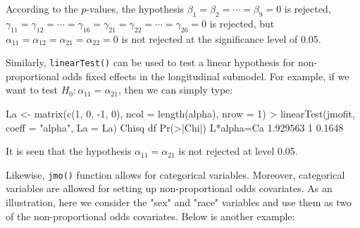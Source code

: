 According to the $p$-values, the hypothesis $\beta_1=\beta_2=\cdots=\beta_9=0$ is rejected, $\gamma_{11}=\gamma_{12}=\cdots=\gamma_{16}= \gamma_{21}=\gamma_{22}=\cdots=\gamma_{26}=0$ is rejected, but $\alpha_{11}=\alpha_{12}= \alpha_{21}=\alpha_{22}=0$ is not rejected at the significance level of 0.05.

Similarly, \texttt{linearTest()} can be used to test a linear hypothesis for non-proportional odds fixed effects in the longitudinal submodel. For example, if we want to test $H_0 : \alpha_{11} = \alpha_{21}$, then we can simply type:

\begin{example}
La <- matrix(c(1, 0, -1, 0), ncol = length(alpha), nrow = 1)
> linearTest(jmofit, coeff = "alpha", La = La)
              Chisq df Pr(>|Chi|)
L*alpha=Ca 1.929563  1 0.1648
\end{example}
It is seen that the hypothesis $\alpha_{11} = \alpha_{21}$ is not rejected at level 0.05.

Likewise, \texttt{jmo()} function allows for categorical variables. Moreover, categorical variables are allowed for setting up non-proportional odds covariates. As an illustration, here we consider the "sex" and "race" variables and use them as two of the non-proportional odds covariates. Below is another example:

